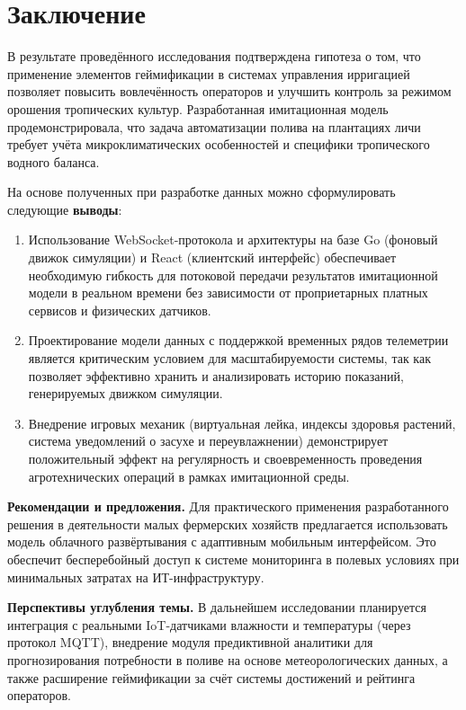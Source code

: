 \section*{Заключение}

В результате проведённого исследования подтверждена гипотеза о том, что
применение элементов геймификации в системах управления ирригацией позволяет
повысить вовлечённость операторов и улучшить контроль за режимом орошения
тропических культур. Разработанная имитационная модель продемонстрировала,
что задача автоматизации полива на плантациях личи требует учёта
микроклиматических особенностей и специфики тропического водного баланса.

На основе полученных при разработке данных можно сформулировать следующие
\textbf{выводы}:

\begin{enumerate}
    \item Использование WebSocket-протокола и архитектуры на базе Go
    (фоновый движок симуляции) и React (клиентский интерфейс)
    обеспечивает необходимую гибкость для потоковой передачи
    результатов имитационной модели в реальном времени без зависимости
    от проприетарных платных сервисов и физических датчиков.
    \item Проектирование модели данных с поддержкой временных рядов
    телеметрии является критическим условием для масштабируемости
    системы, так как позволяет эффективно хранить и анализировать
    историю показаний, генерируемых движком симуляции.
    \item Внедрение игровых механик (виртуальная лейка, индексы здоровья
    растений, система уведомлений о засухе и переувлажнении)
    демонстрирует положительный эффект на регулярность и своевременность
    проведения агротехнических операций в рамках имитационной среды.
\end{enumerate}

\textbf{Рекомендации и предложения.} Для практического применения разработанного
решения в деятельности малых фермерских хозяйств предлагается использовать
модель облачного развёртывания с адаптивным мобильным интерфейсом. Это обеспечит
бесперебойный доступ к системе мониторинга в полевых условиях при минимальных
затратах на ИТ-инфраструктуру.

\textbf{Перспективы углубления темы.} В дальнейшем исследовании планируется
интеграция с реальными IoT-датчиками влажности и температуры (через протокол
MQTT), внедрение модуля предиктивной аналитики для прогнозирования потребности
в поливе на основе метеорологических данных, а также расширение геймификации
за счёт системы достижений и рейтинга операторов.

